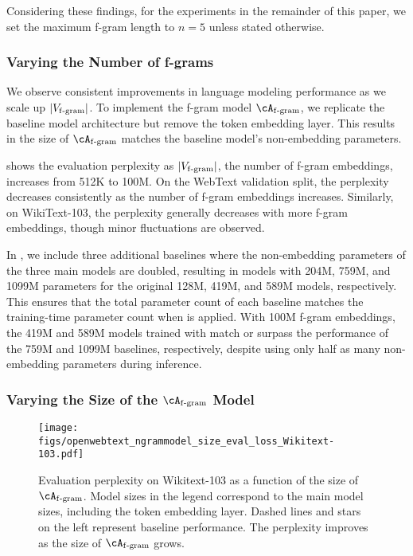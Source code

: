 Considering these findings, for the experiments in the remainder of this paper, we set the maximum f-gram length to $n=5$ unless stated otherwise.

\subsubsection{Varying the Number of f-grams}


We observe consistent improvements in language modeling performance as we scale up $|V_{\mathrm{f\text{-}gram}}|$.  To implement the f-gram model $\Afgram$, we replicate the baseline model architecture but remove the token embedding layer. This results in the size of $\Afgram$ matches the baseline model's non-embedding parameters. 

 shows the evaluation perplexity as $|V_{\mathrm{f\text{-}gram}}|$, the number of f-gram embeddings, increases from 512K to 100M. On the WebText validation split, the perplexity decreases consistently as the number of f-gram embeddings increases. Similarly, on WikiText-103, the perplexity generally decreases with more f-gram embeddings, though minor fluctuations are observed. 

In , we include three additional baselines where the non-embedding parameters of the three main models are doubled, resulting in models with 204M, 759M, and 1099M parameters for the original 128M, 419M, and 589M models, respectively. This ensures that the total parameter count of each baseline matches the training-time parameter count when \SCONE is applied. With 100M f-gram embeddings, the 419M and 589M models trained with \SCONE match or surpass the performance of the 759M and 1099M baselines, respectively, despite using only half as many non-embedding parameters during inference.

\subsubsection{Varying the Size of the $\Afgram$ Model}\label{subsec:ngram_model_size}

\begin{figure}[ht]
    \centering
    \texttt{[image: figs/openwebtext\_ngrammodel\_size\_eval\_loss\_Wikitext-103.pdf]}
    \caption{Evaluation perplexity on Wikitext-103 as a function of the size of $\Afgram$. Model sizes in the legend correspond to the main model sizes, including the token embedding layer. Dashed lines and stars on the left represent baseline performance.  The perplexity improves as the size of $\Afgram$ grows.}
    \label{fig:scale_ngram_model}
\end{figure}

